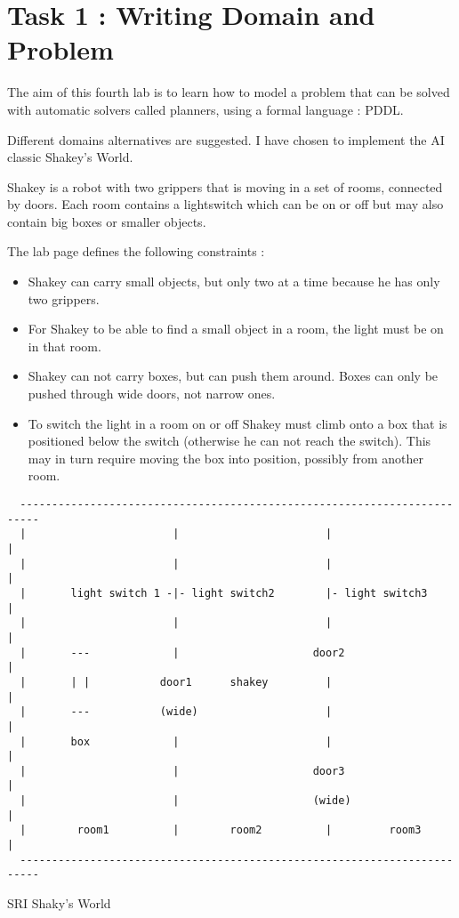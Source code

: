 \section*{Task 1 : Writing Domain and Problem}
\thispagestyle{empty}

The aim of this fourth lab is to learn how to model a problem that can be
solved with automatic solvers called planners, using a formal language : PDDL.

Different domains alternatives are suggested. I have chosen to implement the AI
classic Shakey's World.

Shakey is a robot with two grippers that is moving in a set of rooms, connected
by doors. Each room contains a lightswitch which can be on or off but may also
contain big boxes or smaller objects.

The lab page defines the following constraints :
\begin{itemize}
  \item Shakey can carry small objects, but only two at a time because he has
  only two grippers.
  \item For Shakey to be able to find a small object in a room, the light must
  be on in that room.
  \item Shakey can not carry boxes, but can push them around. Boxes can only be
  pushed through wide doors, not narrow ones.
  \item To switch the light in a room on or off Shakey must climb onto a box
  that is positioned below the switch (otherwise he can not reach the switch).
  This may in turn require moving the box into position, possibly from another
  room.
\end{itemize}

\begin{center}
  \begin{verbatim}
  -------------------------------------------------------------------------
  |                       |                       |                       |
  |                       |                       |                       |
  |       light switch 1 -|- light switch2        |- light switch3        |
  |                       |                       |                       |
  |       ---             |                     door2                     |
  |       | |           door1      shakey         |                       |
  |       ---           (wide)                    |                       |
  |       box             |                       |                       |
  |                       |                     door3                     |
  |                       |                     (wide)                    |
  |        room1          |        room2          |         room3         |
  -------------------------------------------------------------------------
  \end{verbatim}
  SRI Shaky's World
\end{center}

